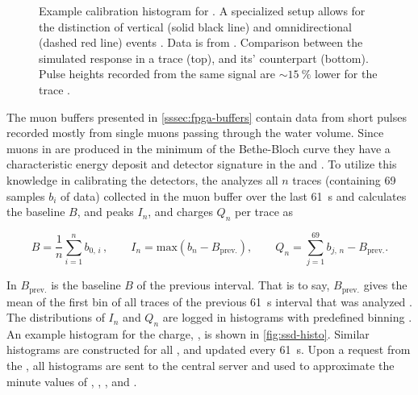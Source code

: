 \begin{figure}[t]
  \centering
  \hspace{0.2cm}
  \caption[]{ Example calibration histogram for \Qmip. A
  specialized \DAQ setup allows for the distinction of vertical (solid black
  line) and omnidirectional (dashed red line) events 
  \cite{assisMeasurementWaterCherenkovDetector2016}. Data is from 
  \cite{sarmentoVerticalVsOmnidirectional2024}. 
   Comparison between the simulated \WCD 
  response in a \UUB \FBW trace (top), and its' \FDS counterpart (bottom). 
  Pulse heights recorded from the same signal are $\sim\SI{15}{\percent}$ lower
  for the \FDS trace \cite{convengaLocalStationCalibrationDummies2023}.
}
  \label{fig:uub-trace-details}
\end{figure}

The muon buffers presented in \cref{sssec:fpga-buffers} contain data from short
pulses recorded mostly from single muons passing through the water volume. 
Since muons in \EASs are produced in the minimum of the Bethe-Bloch curve they 
have a characteristic energy deposit and detector signature in the \WCD and 
\SSD. To utilize this knowledge in calibrating the detectors, the \CPU analyzes
all $n$ traces (containing 69 samples $b_i$ of data) collected in the muon 
buffer over the last \SI{61}{\second} and calculates the baseline $B$, and 
peaks $I_n$, and charges $Q_n$ per trace as 

\begin{equation}
\label{eq:peak-and-charge}
B = \frac{1}{n} \sum^n_{i=1} b_{0,\,i}\,, \qquad I_n = \mathrm{max}\left( b_{n} - B_\mathrm{prev.} \right), \qquad Q_n = \sum^{69}_{j=1} b_{j,\,n} - B_\mathrm{prev.}. 
\end{equation}

In \cite{satoUUBDAQRelease2024} $B_\mathrm{prev.}$ is the baseline $B$ of the 
previous \DAQ interval. That is to say, $B_\mathrm{prev.}$ gives the mean of 
the first bin of all traces of the previous \SI{61}{\second} interval that was
analyzed \cite{satoUUBDAQRelease2024}. The distributions of $I_n$ and $Q_n$ are
logged in histograms with predefined binning 
\cite{bertouCalibrationSurfaceArray2006}. An example histogram for the \SSD
charge, \Qmip, is shown in \cref{fig:ssd-histo}. Similar histograms are 
constructed for all \WCD \LPMTs, and updated every \SI{61}{\second}. Upon a 
\TTHREE request from the \CDAS, all histograms are sent to the central server 
and used to approximate the minute values of \Ivem, \Qvem, \Imip, and \Qmip {}.

